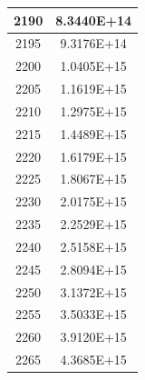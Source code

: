 \documentclass[a4paper]{article}
\begin{document}
\begin{tabular}{|c|c|}
		\hline
		2190 & 8.3440E+14 \\
		\hline
		2195 & 9.3176E+14 \\
		\hline
		2200 & 1.0405E+15 \\
		\hline
		2205 & 1.1619E+15 \\
		\hline
		2210 & 1.2975E+15 \\
		\hline
		2215 & 1.4489E+15 \\
		\hline
		2220 & 1.6179E+15 \\
		\hline
		2225 & 1.8067E+15 \\
		\hline
		2230 & 2.0175E+15 \\
		\hline
		2235 & 2.2529E+15 \\
		\hline
		2240 & 2.5158E+15 \\
		\hline
		2245 & 2.8094E+15 \\
		\hline
		2250 & 3.1372E+15 \\
		\hline
		2255 & 3.5033E+15 \\
		\hline
		2260 & 3.9120E+15 \\
		\hline
		2265 & 4.3685E+15 \\
		\hline
	\end{tabular}
	\hfill
\end{document}

